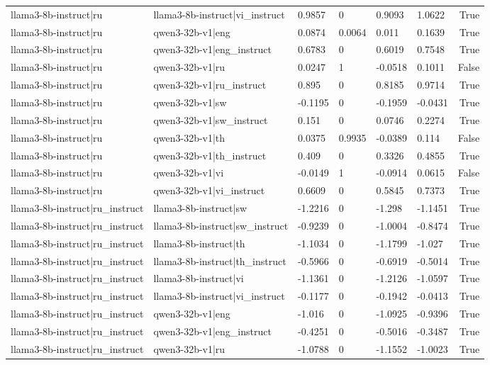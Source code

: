 \begin{table}
\begin{tabular}{llllllr}
llama3-8b-instruct|ru & llama3-8b-instruct|vi_instruct & 0.9857 & 0 & 0.9093 & 1.0622 & True \\
llama3-8b-instruct|ru & qwen3-32b-v1|eng & 0.0874 & 0.0064 & 0.011 & 0.1639 & True \\
llama3-8b-instruct|ru & qwen3-32b-v1|eng_instruct & 0.6783 & 0 & 0.6019 & 0.7548 & True \\
llama3-8b-instruct|ru & qwen3-32b-v1|ru & 0.0247 & 1 & -0.0518 & 0.1011 & False \\
llama3-8b-instruct|ru & qwen3-32b-v1|ru_instruct & 0.895 & 0 & 0.8185 & 0.9714 & True \\
llama3-8b-instruct|ru & qwen3-32b-v1|sw & -0.1195 & 0 & -0.1959 & -0.0431 & True \\
llama3-8b-instruct|ru & qwen3-32b-v1|sw_instruct & 0.151 & 0 & 0.0746 & 0.2274 & True \\
llama3-8b-instruct|ru & qwen3-32b-v1|th & 0.0375 & 0.9935 & -0.0389 & 0.114 & False \\
llama3-8b-instruct|ru & qwen3-32b-v1|th_instruct & 0.409 & 0 & 0.3326 & 0.4855 & True \\
llama3-8b-instruct|ru & qwen3-32b-v1|vi & -0.0149 & 1 & -0.0914 & 0.0615 & False \\
llama3-8b-instruct|ru & qwen3-32b-v1|vi_instruct & 0.6609 & 0 & 0.5845 & 0.7373 & True \\
llama3-8b-instruct|ru_instruct & llama3-8b-instruct|sw & -1.2216 & 0 & -1.298 & -1.1451 & True \\
llama3-8b-instruct|ru_instruct & llama3-8b-instruct|sw_instruct & -0.9239 & 0 & -1.0004 & -0.8474 & True \\
llama3-8b-instruct|ru_instruct & llama3-8b-instruct|th & -1.1034 & 0 & -1.1799 & -1.027 & True \\
llama3-8b-instruct|ru_instruct & llama3-8b-instruct|th_instruct & -0.5966 & 0 & -0.6919 & -0.5014 & True \\
llama3-8b-instruct|ru_instruct & llama3-8b-instruct|vi & -1.1361 & 0 & -1.2126 & -1.0597 & True \\
llama3-8b-instruct|ru_instruct & llama3-8b-instruct|vi_instruct & -0.1177 & 0 & -0.1942 & -0.0413 & True \\
llama3-8b-instruct|ru_instruct & qwen3-32b-v1|eng & -1.016 & 0 & -1.0925 & -0.9396 & True \\
llama3-8b-instruct|ru_instruct & qwen3-32b-v1|eng_instruct & -0.4251 & 0 & -0.5016 & -0.3487 & True \\
llama3-8b-instruct|ru_instruct & qwen3-32b-v1|ru & -1.0788 & 0 & -1.1552 & -1.0023 & True \\

\end{tabular}
\end{table}
